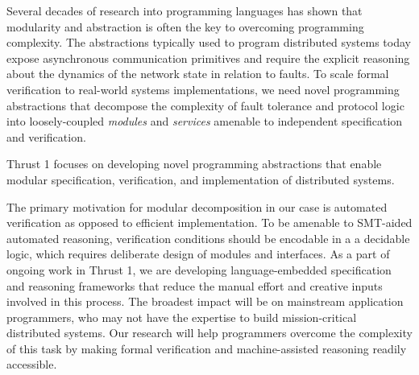 Several decades of research into programming languages has shown that
modularity and abstraction is often the key to overcoming programming
complexity. The abstractions typically used to program distributed systems
today expose asynchronous communication primitives and require the explicit
reasoning about the dynamics of the network state in relation to faults. To
scale formal verification to real-world systems implementations, we need
novel programming abstractions that decompose the complexity of fault
tolerance and protocol logic into loosely-coupled \emph{modules} and
\emph{services} amenable to independent specification and verification.

\begin{mdquote}
Thrust 1 focuses on developing novel programming abstractions that enable
modular specification, verification, and implementation of distributed systems.
\end{mdquote}

The primary motivation for modular decomposition in our case is automated
verification as opposed to efficient implementation. To be amenable to
SMT-aided automated reasoning, verification conditions should be encodable
in a a decidable logic, which requires deliberate design of modules and
interfaces. As a part of ongoing work in Thrust 1, we are developing
language-embedded specification and reasoning frameworks that reduce the
manual effort and creative inputs involved in this process. The broadest
impact will be on mainstream application programmers, who may not have the
expertise to build mission-critical distributed systems. Our research will
help programmers overcome the complexity of this task by making formal
verification and machine-assisted reasoning readily accessible. 

